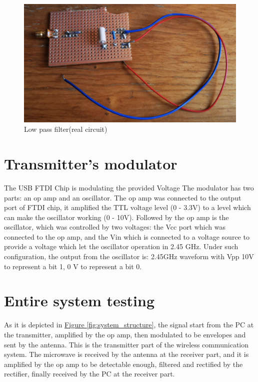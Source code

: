 \documentclass[12pt,a4paper]{report}
\begin{document}
\begin{figure}[H]
    \centerline{\includegraphics{rectifier.png}}
    \caption{Low pass filter(real circuit)}
    \label{RealLPF}
\end{figure}

\chapter{Transmitter's modulator}
The USB FTDI Chip is modulating the provided Voltage
The modulator has two parts: an op amp and an oscillator. The op amp was connected to the output port of FTDI chip, it amplified the TTL voltage level (0 - 3.3V) to a level which can make the oscillator working (0 - 10V). Followed by the op amp is the oscillator, which was controlled by two voltages: the Vcc port which was connected to the op amp, and the Vin which is connected to a voltage source to provide a voltage which let the oscillator operation in 2.45 GHz.
Under such configuration, the output from the oscillator is: 2.45GHz waveform with Vpp 10V to represent a bit 1, 0 V to represent a bit 0.

\chapter{Entire system testing}
As it is depicted in \hyperref[fig:system_structure]{Figure \ref*{fig:system_structure}}, the signal start from the PC at the transmitter, amplified by the op amp, then modulated to be envelopes and sent by the antenna. This is the transmitter part of the wireless communication system. The microwave is received by the antenna at the receiver part, and it is amplified by the op amp to be detectable enough, filtered and rectified by the rectifier, finally received by the PC at the receiver part.
\end{document}
